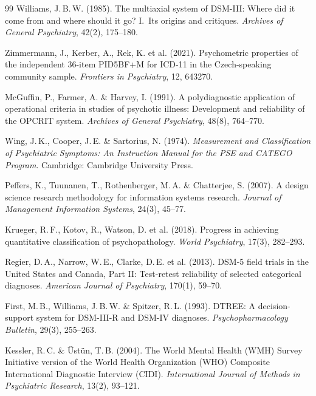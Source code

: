 \documentclass[11pt,a4paper]{article}
\begin{document}
\begin{thebibliography}{99}
Williams, J.\,B.\,W. (1985).
\newblock The multiaxial system of DSM-III: Where did it come from and where should it go? I.\ Its origins and critiques.
\newblock \textit{Archives of General Psychiatry}, 42(2), 175--180.

Zimmermann, J., Kerber, A., Rek, K. et al. (2021).
\newblock Psychometric properties of the independent 36-item PID5BF+M for ICD-11 in the Czech-speaking community sample.
\newblock \textit{Frontiers in Psychiatry}, 12, 643270.

McGuffin, P., Farmer, A. \& Harvey, I. (1991).
\newblock A polydiagnostic application of operational criteria in studies of psychotic illness: Development and reliability of the OPCRIT system.
\newblock \textit{Archives of General Psychiatry}, 48(8), 764--770.

Wing, J.\,K., Cooper, J.\,E. \& Sartorius, N. (1974).
\newblock \textit{Measurement and Classification of Psychiatric Symptoms: An Instruction Manual for the PSE and CATEGO Program}.
\newblock Cambridge: Cambridge University Press.

Peffers, K., Tuunanen, T., Rothenberger, M.\,A. \& Chatterjee, S. (2007).
\newblock A design science research methodology for information systems research.
\newblock \textit{Journal of Management Information Systems}, 24(3), 45--77.

Krueger, R.\,F., Kotov, R., Watson, D. et al. (2018).
\newblock Progress in achieving quantitative classification of psychopathology.
\newblock \textit{World Psychiatry}, 17(3), 282--293.

Regier, D.\,A., Narrow, W.\,E., Clarke, D.\,E. et al. (2013).
\newblock DSM-5 field trials in the United States and Canada, Part II: Test-retest reliability of selected categorical diagnoses.
\newblock \textit{American Journal of Psychiatry}, 170(1), 59--70.

First, M.\,B., Williams, J.\,B.\,W. \& Spitzer, R.\,L. (1993).
\newblock DTREE: A decision-support system for DSM-III-R and DSM-IV diagnoses.
\newblock \textit{Psychopharmacology Bulletin}, 29(3), 255--263.

Kessler, R.\,C. \& \"{U}st\"{u}n, T.\,B. (2004).
\newblock The World Mental Health (WMH) Survey Initiative version of the World Health Organization (WHO) Composite International Diagnostic Interview (CIDI).
\newblock \textit{International Journal of Methods in Psychiatric Research}, 13(2), 93--121.


\end{thebibliography}
\end{document}

